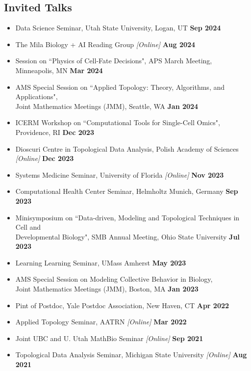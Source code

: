 \documentclass[margin,line]{res}
\begin{document}
\begin{resume}
\section{\sc Invited Talks}
{\renewcommand\leftmargini{0em}
\begin{itemize}
\setlength\itemsep{0.3em}
\item[] Data Science Seminar, Utah State University, Logan, UT \hfill {\bf \small Sep 2024}
\item[] The Mila Biology + AI Reading Group \textit{[Online]} \hfill {\bf \small Aug 2024}
\item[] Session on ``Physics of Cell-Fate Decisions", APS March Meeting, Minneapolis, MN \hfill {\bf \small Mar 2024} 
\item[] AMS Special Session on ``Applied Topology: Theory, Algorithms, and Applications",\\Joint Mathematics Meetings (JMM), Seattle, WA \hfill {\bf \small Jan 2024} 
\item[] ICERM Workshop on ``Computational Tools for Single-Cell Omics", Providence, RI \hfill {\bf \small Dec 2023} 
\item[] Dioscuri Centre in Topological Data Analysis, Polish Academy of Sciences \textit{[Online]} \hfill {\bf \small Dec 2023}
\item[] Systems Medicine Seminar, University of Florida \textit{[Online]} \hfill {\bf \small Nov 2023}
\item[] Computational Health Center Seminar, Helmholtz Munich, Germany \hfill {\bf \small Sep 2023}
\item[] Minisymposium on ``Data-driven, Modeling and Topological Techniques in Cell and \\Developmental Biology", SMB Annual Meeting, Ohio State University \hfill {\bf \small Jul 2023}
\item[] Learning Learning Seminar, UMass Amherst \hfill {\bf \small May 2023}
\item[] AMS Special Session on Modeling Collective Behavior in Biology,\\Joint Mathematics Meetings (JMM), Boston, MA \hfill {\bf \small Jan 2023}
\item[] Pint of Postdoc, Yale Postdoc Association, New Haven, CT \hfill {\bf \small Apr 2022}
\item[] Applied Topology Seminar, AATRN \textit{[Online]} \hfill {\bf \small Mar 2022}
\item[] Joint UBC and U. Utah MathBio Seminar \textit{[Online]} \hfill {\bf \small Sep 2021}
\item[] Topological Data Analysis Seminar, Michigan State University \textit{[Online]} \hfill {\bf \small Aug 2021}

\end{itemize}}
\end{resume}
\end{document}
